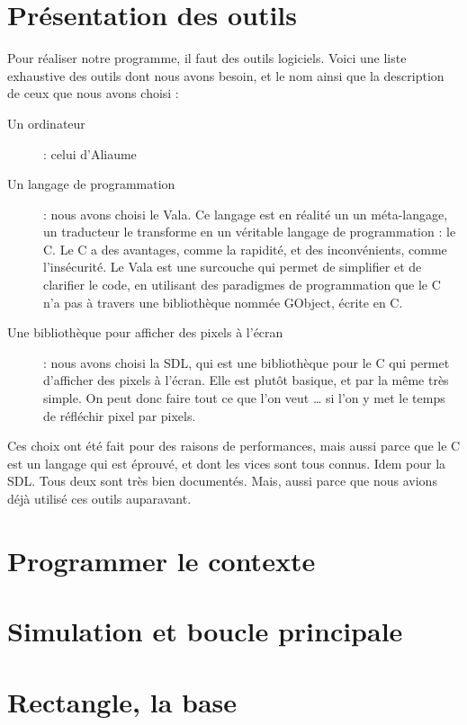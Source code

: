 \section{Présentation des outils}
  Pour réaliser notre programme, il faut des outils logiciels.
  Voici une liste exhaustive des outils dont nous avons besoin, et le 
  nom ainsi que la description de ceux que nous avons choisi : 
    \begin{description}
      \item[Un ordinateur] : celui d'Aliaume 
      \item[Un langage de programmation] : nous avons choisi le Vala. Ce langage est en réalité un
        un méta-langage, un traducteur le transforme en un véritable langage de programmation : le C.
        Le C a des avantages, comme la rapidité, et des inconvénients, comme l'insécurité. Le Vala est une 
        surcouche qui permet de simplifier et de clarifier le code, en utilisant des paradigmes de programmation
        que le C n'a pas à travers une bibliothèque nommée GObject, écrite en C.
      \item[Une bibliothèque pour afficher des pixels à l'écran] : nous avons choisi la SDL, qui est une bibliothèque pour le C qui permet d'afficher des pixels à l'écran. Elle est plutôt basique, et par la même très simple. On peut donc faire tout ce que l'on veut … si l'on y met le temps de réfléchir pixel par pixels.
    \end{description}
  
  Ces choix ont été fait pour des raisons de performances, mais aussi parce que le C est un langage qui est éprouvé, et dont les vices sont tous connus. Idem pour la SDL. Tous deux sont très bien documentés. Mais, aussi parce que nous avions déjà utilisé ces outils auparavant.

\section{Programmer le contexte}
  

\section{Simulation et boucle principale}
  
\section{Rectangle, la base}
  
  
